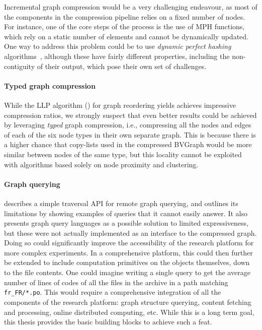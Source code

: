 Incremental graph compression would be a very challenging endeavour, as most of
the components in the compression pipeline relies on a fixed number of nodes.
For instance, one of the core steps of the process is the use of \gls{MPH}
functions, which rely on a static number of elements and cannot be dynamically
updated. One way to address this problem could be to use \emph{dynamic perfect
hashing} algorithms~\cite{fredman1984storing,dietzfelbinger1994dynamic},
although these have fairly different properties, including the non-contiguity
of their output, which pose their own set of challenges.

\paragraph*{Typed graph compression}

While the \gls{LLP} algorithm (\cite{sec:llp-compression}) for graph reordering
yields achieves impressive compression ratios, we strongly suspect that even
better results could be achieved by leveraging \emph{typed} graph compression,
i.e., compressing all the nodes and edges of each of the six node types in
their own separate graph. This is because there is a higher chance that
copy-lists used in the compressed BVGraph would be more similar between nodes
of the same type, but this locality cannot be exploited with algorithms based
solely on node proximity and clustering.

\paragraph*{Graph querying}

 describes a simple traversal API for remote graph
querying, and outlines its limitations by showing examples of queries that it
cannot easily answer. It also presents graph query languages as a possible
solution to limited expressiveness, but these were not actually implemented as
an interface to the compressed graph. Doing so could significantly improve the
accessibility of the research platform for more complex experiments. In a
comprehensive platform, this could then further be extended to include
computation primitives on the objects themselves, down to the file contents.
One could imagine writing a single query to get the average number of lines of
codes of all the files in the archive in a path matching
\texttt{fr_FR/*.po}.  This would require a comprehensive integration
of all the components of the research platform: graph structure querying,
content fetching and processing, online distributed computing, etc. While this
is a long term goal, this thesis provides the basic building blocks to achieve
such a feat.

